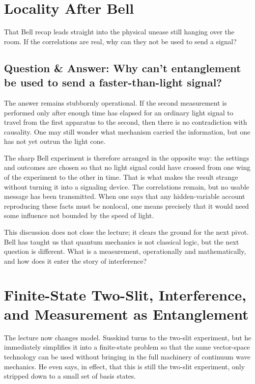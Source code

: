 \section{Locality After Bell}

That Bell recap leads straight into the physical unease still hanging over the room. If the correlations are real, why can they not be used to send a signal?

\subsection{Question \& Answer: Why can’t entanglement be used to send a faster-than-light signal?}

The answer remains stubbornly operational. If the second measurement is performed only after enough time has elapsed for an ordinary light signal to travel from the first apparatus to the second, then there is no contradiction with causality. One may still wonder what mechanism carried the information, but one has not yet outrun the light cone.

The sharp Bell experiment is therefore arranged in the opposite way: the settings and outcomes are chosen so that no light signal could have crossed from one wing of the experiment to the other in time. That is what makes the result strange without turning it into a signaling device. The correlations remain, but no usable message has been transmitted. When one says that any hidden-variable account reproducing these facts must be nonlocal, one means precisely that it would need some influence not bounded by the speed of light.

This discussion does not close the lecture; it clears the ground for the next pivot. Bell has taught us that quantum mechanics is not classical logic, but the next question is different. What is a measurement, operationally and mathematically, and how does it enter the story of interference?

\section{Finite-State Two-Slit, Interference, and Measurement as Entanglement}

The lecture now changes model. Susskind turns to the two-slit experiment, but he immediately simplifies it into a finite-state problem so that the same vector-space technology can be used without bringing in the full machinery of continuum wave mechanics. He even says, in effect, that this is still the two-slit experiment, only stripped down to a small set of basis states.

